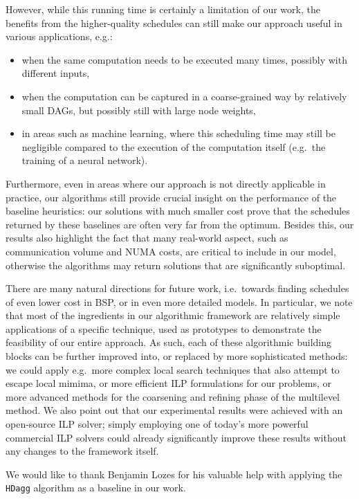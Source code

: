 \documentclass[sigconf,nonacm]{acmart}
\begin{document}
However, while this running time is certainly a limitation of our work, the benefits from the higher-quality schedules can still make our approach useful in various applications, e.g.:
\begin{itemize}[topsep=3pt,itemsep=0pt,partopsep=2pt,parsep=3pt]
 \item when the same computation needs to be executed many times, possibly with different inputs,
 \item when the computation can be captured in a coarse-grained way by relatively small DAGs, but possibly still with large node weights,
 \item in areas such as machine learning, where this scheduling time may still be negligible compared to the execution of the computation itself (e.g.\ the training of a neural network).
\end{itemize}
Furthermore, even in areas where our approach is not directly applicable in practice, our algorithms still provide crucial insight on the performance of the baseline heuristics: our solutions with much smaller cost prove that the schedules returned by these baselines are often very far from the optimum. Besides this, our results also highlight the fact that many real-world aspect, such as communication volume and NUMA costs, are critical to include in our model, otherwise the algorithms may return solutions that are significantly suboptimal.

There are many natural directions for future work, i.e.\ towards finding schedules of even lower cost in BSP, or in even more detailed models. In particular, we note that most of the ingredients in our algorithmic framework are relatively simple applications of a specific technique, used as prototypes to demonstrate the feasibility of our entire approach. As such, each of these algorithmic building blocks can be further improved into, or replaced by more sophisticated methods: we could apply e.g.\ more complex local search techniques that also attempt to escape local mimima, or more efficient ILP formulations for our problems, or more advanced methods for the coarsening and refining phase of the multilevel method. We also point out that our experimental results were achieved with an open-source ILP solver; simply employing one of today's more powerful commercial ILP solvers could already significantly improve these results without any changes to the framework itself.

\begin{acks}
We would like to thank Benjamin Lozes for his valuable help with applying the \texttt{HDagg} algorithm as a baseline in our work.
\end{acks}
\end{document}
